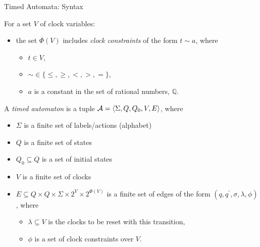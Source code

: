 \documentclass[10pt]{beamer}
\theoremstyle{plain}
\theoremstyle{definition}
\begin{document}

\begin{frame}{Timed Automata: Syntax}
	\begin{block}{}
		For a set $V$ of clock variables:
		\begin{itemize}
		\item
		the set $\Phi(V)$ includes \emph{clock constraints} of the form $t\sim a$, where 
			\begin{itemize}
				\item
				$t\in V$, 
				\item
				$\sim\in\{\leq, \geq, <, >, =\}$, 
				\item
				$a$ is a constant in the set of rational numbers, $\mathbb{Q}$.
			\end{itemize}
		\end{itemize}
	\end{block}
	A \emph{timed automaton} is a tuple ${\cal A} = \langle \Sigma, Q, Q_0, V, E \rangle$, where
	\begin{itemize}
		\item $\Sigma$  is a finite set of labels/actions (alphabet)
		\item $Q$ is a finite set of states
		\item $Q_0 \subseteq Q$ is a set of initial states
		\item $V$ is a finite set of clocks
		\item $E \subseteq Q \times Q \times \Sigma \times 2^{V} \times 2^{\Phi(V)}$ is a finite set of edges of the form $(q, q^\prime, \sigma, \lambda, \phi)$, where 
			\begin{itemize}
			\item
			$\lambda \subseteq V$ is the clocks to be reset with this transition, 
			\item
			$\phi$ is a set of clock constraints over $V$.
			\end{itemize}
	\end{itemize}
\end{frame}

\end{document}

